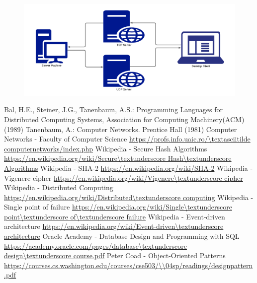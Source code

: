 \documentclass[runningheads]{llncs}
\begin{document}
\begin{figure}[H]
\centering
\includegraphics[width=150mm]{RDC Network Diagram.png}
\end{figure}

\begin{thebibliography}{8}

\bibitem{}
Bal, H.E., Steiner, J.G., Tanenbaum, A.S.: Programming Languages for Distributed Computing Systems, Association for Computing Machinery(ACM) (1989)
\bibitem{}
Tanenbaum, A.: Computer Networks. Prentice Hall (1981)
\bibitem{}
Computer Networks - Faculty of Computer Science \url{https://profs.info.uaic.ro/\textasciitilde computernetworks/index.php}
\bibitem{}
Wikipedia - Secure Hash Algorithms \url{https://en.wikipedia.org/wiki/Secure\textunderscore Hash\textunderscore Algorithms}
\bibitem{}
Wikipedia - SHA-2 \url{https://en.wikipedia.org/wiki/SHA-2}
\bibitem{}
Wikipedia - Vigenere cipher \url{https://en.wikipedia.org/wiki/Vigenere\textunderscore cipher}
\bibitem{}
Wikipedia - Distributed Computing \url{https://en.wikipedia.org/wiki/Distributed\textunderscore computing}
\bibitem{}
Wikipedia - Single point of failure \url{https://en.wikipedia.org/wiki/Single\textunderscore point\textunderscore of\textunderscore failure}
\bibitem{}
Wikipedia - Event-driven architecture \url{https://en.wikipedia.org/wiki/Event-driven\textunderscore architecture}
\bibitem{}
Oracle Academy - Database Design and Programming with SQL \url{https://academy.oracle.com/pages/database\textunderscore design\textunderscore course.pdf}
\bibitem{}
Peter Coad - Object-Oriented Patterns \url{https://courses.cs.washington.edu/courses/cse503/\\04sp/readings/designpattern.pdf}

\end{thebibliography}
\end{document}
